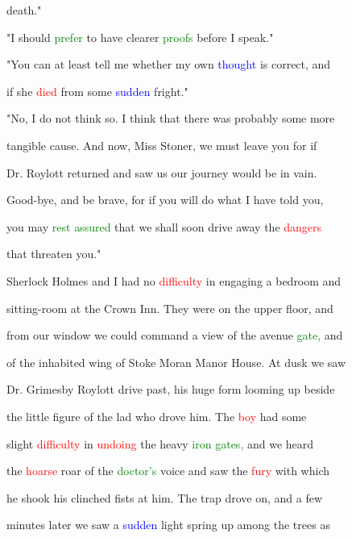  \textcolor{BurntOrange}{death."}



 "I should \textcolor{green}{prefer} to have clearer \textcolor{green}{proofs} before I speak."



 "You can at least tell me whether my own \textcolor{blue}{thought} is correct, and

 if she \textcolor{red}{died} from some \textcolor{blue}{sudden} \textcolor{BurntOrange}{fright."}



 "No, I do not think so. I think that there was probably some more

 tangible cause. And now, Miss Stoner, we must \textcolor{BurntOrange}{leave} you for if

 Dr. Roylott returned and saw us our \textcolor{BurntOrange}{journey} would be in vain.

 Good-bye, and be brave, for if you will do what I have told you,

 you may \textcolor{green}{rest} \textcolor{green}{assured} that we shall soon drive away the \textcolor{red}{dangers}

 that \textcolor{BurntOrange}{threaten} you."



 Sherlock Holmes and I had no \textcolor{red}{difficulty} in engaging a bedroom and

 sitting-room at the Crown Inn. They were on the upper floor, and

 from our window we could command a view of the avenue \textcolor{green}{gate,} and

 of the inhabited wing of Stoke Moran Manor House. At dusk we saw

 Dr. Grimesby Roylott drive past, his huge form \textcolor{BurntOrange}{looming} up beside

 the little figure of the lad who drove him. The \textcolor{red}{boy} had some

 slight \textcolor{red}{difficulty} in \textcolor{red}{undoing} the heavy \textcolor{green}{iron} \textcolor{green}{gates,} and we heard

 the \textcolor{red}{hoarse} roar of the \textcolor{green}{doctor's} voice and saw the \textcolor{red}{fury} with which

 he shook his clinched fists at him. The trap drove on, and a few

 minutes later we saw a \textcolor{blue}{sudden} light spring up among the \textcolor{BurntOrange}{trees} as

